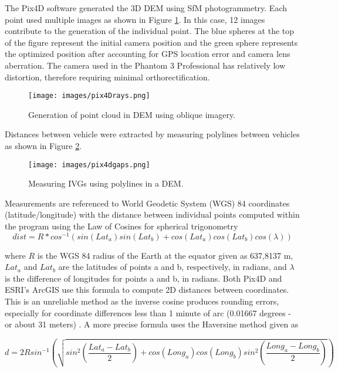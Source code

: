 \documentclass[preprint,12pt,a4paper,authoryear]{elsarticle}
\begin{document}
\begin{linenumbers}
The Pix4D software generated the 3D DEM using SfM photogrammetry. Each point used multiple images as shown in Figure \ref{fig:pix4Drays}. In this case, 12 images contribute to the generation of the individual point. The blue spheres at the top of the figure represent the initial camera position and the green sphere represents the optimized position after accounting for GPS location error and camera lens aberration. The camera used in the Phantom 3 Professional has relatively low distortion, therefore requiring minimal orthorectification.
%
\begin{figure}[H]
\texttt{[image: images/pix4Drays.png]} 
\caption{Generation of point cloud in DEM using oblique imagery.}
\label{fig:pix4Drays}
\end{figure}
%

Distances between vehicle were extracted by measuring polylines between vehicles as shown in Figure \ref{fig:pix4Dgaps}.
%
\begin{figure}[H]
\texttt{[image: images/pix4dgaps.png]} 
\caption{Measuring IVGs using polylines in a DEM.}
\label{fig:pix4Dgaps}
\end{figure}
%
Measurements are referenced to World Geodetic System (WGS) 84 coordinates (latitude/longitude) with the distance between individual points computed within the program using the Law of Cosines for spherical trigonometry \citep{Sinnott1984}
%
\begin{equation}
\label{eq:distTrig}
dist = R * cos^{-1}(sin(Lat_{a})sin(Lat_{b}) + cos(Lat_{a})cos(Lat_{b})cos(\lambda))
\end{equation}

\noindent
where $R$ is the WGS 84 radius of the Earth at the equator given as 637,8137 m, $Lat_{a}$ and $Lat_{b}$ are the latitudes of points a and b, respectively, in radians, and $\lambda$ is the difference of longitudes for points a and b, in radians.  Both Pix4D and ESRI's ArcGIS use this formula to compute 2D distances between coordinates. This is an unreliable method as the inverse cosine produces rounding errors, especially for coordinate differences less than 1 minute of arc (0.01667 degrees - or about 31 meters) \citep{Sinnott1984}. A more precise formula uses the Haversine method given as 

\begin{equation}
\label{eq:distHaversine}
d = 2Rsin^{-1}\left (\sqrt{ sin^{2}\left ( \frac{Lat_{a}-Lat_{b}}{2} \right ) + cos(Long_{a})cos(Long_{b})sin^{2} \left ( \frac{Long_{a}-Long_{b}}{2} \right ) } \right )
\end{equation}


\end{linenumbers}
\end{document}
